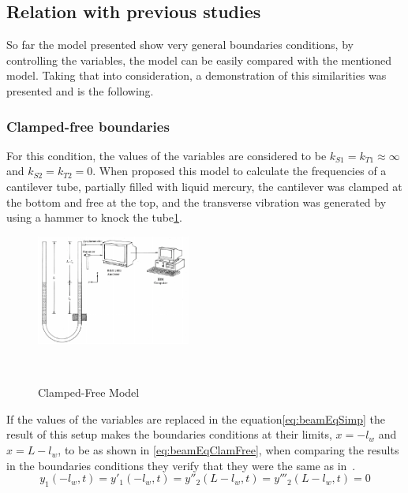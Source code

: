 \subsection{Relation with previous studies}
So far the model presented show very general boundaries conditions, by controlling the variables, the model can be easily compared with the mentioned model. Taking that into consideration, a demonstration of this similarities was presented and is the following.
    \subsubsection{Clamped-free boundaries}
    For this condition, the values of the variables are considered to be $k_{S1}=k_{T1}\approx\infty$ and $k_{S2}=k_{T2}=0$. When \citeauthor{chanFreeVibrationCantilever1995} proposed this model to calculate the frequencies of a cantilever tube, partially filled with liquid mercury, the cantilever was clamped at the bottom and free at the top, and the transverse vibration was generated by using a hammer to knock the tube\ref{fig:clampedfreemodel}. 
    \begin{figure}[]
        \centering
        \includegraphics[width=0.45\textwidth]{Chapters/2CHP/Diagrams/clampedfreemodel.pdf}
        \caption{Clamped-Free Model}{~\cite{chanFreeVibrationCantilever1995}}
        \label{fig:clampedfreemodel}
    \end{figure}
    If the values of the variables are replaced in the equation\ref{eq:beamEqSimp} the result of this setup makes the boundaries conditions at their limits, $x=-l_w$ and $x=L-l_w$, to be as shown in \ref{eq:beamEqClamFree}, when comparing the results in the boundaries conditions they verify that they were the same as in~\cite{chanFreeVibrationCantilever1995}.
    \begin{equation} \label{eq:beamEqClamFree}
            y_1(-l_w,t) = y'_1(-l_w,t) = y''_2(L-l_w,t) = y'''_2(L-l_w,t)=0
    \end{equation}
